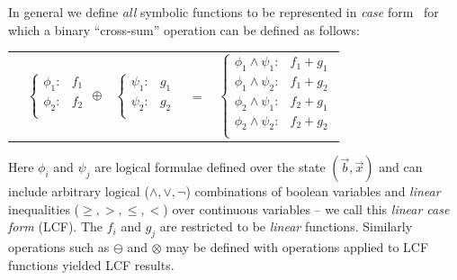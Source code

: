\documentclass[letterpaper]{article}
\begin{document}
In general we define \emph{all} symbolic functions to be represented
in \emph{case} form~\cite{fomdp} for which a binary ``cross-sum'' operation
can be defined as follows:
{\footnotesize 
\begin{center}
\begin{tabular}{r c c c l}
&
\hspace{-6mm} 
  $\begin{cases}
    \phi_1: & f_1 \\ 
    \phi_2: & f_2 \\ 
  \end{cases}$
$\oplus$
&
\hspace{-4mm}
  $\begin{cases}
    \psi_1: & g_1 \\ 
    \psi_2: & g_2 \\ 
  \end{cases}$
&
\hspace{-2mm} 
$ = $
&
\hspace{-2mm}
  $\begin{cases}
  \phi_1 \wedge \psi_1: & f_1 + g_1 \\ 
  \phi_1 \wedge \psi_2: & f_1 + g_2 \\ 
  \phi_2 \wedge \psi_1: & f_2 + g_1 \\ 
  \phi_2 \wedge \psi_2: & f_2 + g_2 \\ 
  \end{cases}$
\end{tabular}
\end{center}
}
\normalsize
Here $\phi_i$ and $\psi_j$ are logical formulae defined over the state
$(\vec{b},\vec{x})$ and can include arbitrary logical
($\land,\lor,\neg$) combinations of boolean variables
and \emph{linear} inequalities ($\geq,>,\leq,<$) over continuous
variables -- we call this \emph{linear case form} (LCF).  The $f_i$
and $g_j$ are restricted to be \emph{linear} functions.  Similarly
operations such as $\ominus$ and $\otimes$ may be defined with operations
applied to LCF functions yielded LCF results.
\end{document}
